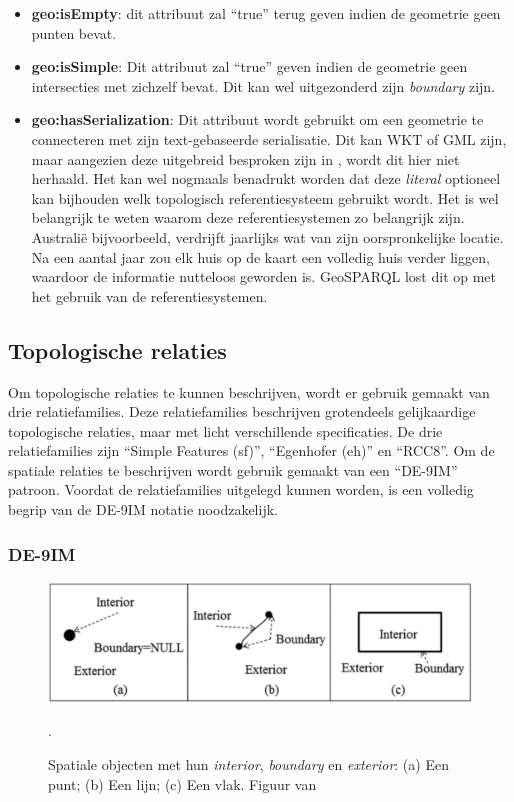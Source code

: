 \begin{itemize}
    \item \textbf{geo:isEmpty}: dit attribuut zal ``true'' terug geven indien de geometrie geen punten bevat.
    \item \textbf{geo:isSimple}: Dit attribuut zal ``true'' geven indien de geometrie geen intersecties met zichzelf bevat. Dit kan wel uitgezonderd zijn \textit{boundary} zijn.
    \item \textbf{geo:hasSerialization}: Dit attribuut wordt gebruikt om een geometrie te connecteren met zijn text-gebaseerde serialisatie. Dit kan WKT of GML zijn, maar aangezien deze uitgebreid besproken zijn in , wordt dit hier niet herhaald. Het kan wel nogmaals benadrukt worden dat deze \textit{literal} optioneel kan bijhouden welk topologisch referentiesysteem gebruikt wordt. Het is wel belangrijk te weten waarom deze referentiesystemen zo belangrijk zijn. Australië bijvoorbeeld, verdrijft jaarlijks wat van zijn oorspronkelijke locatie. Na een aantal jaar zou elk huis op de kaart een volledig huis verder liggen, waardoor de informatie nutteloos geworden is. GeoSPARQL lost dit op met het gebruik van de referentiesystemen.
\end{itemize}


\subsection{Topologische relaties}
\label{subsec:topologische_relaties}
Om topologische relaties te kunnen beschrijven, wordt er gebruik gemaakt van drie relatiefamilies. Deze relatiefamilies beschrijven grotendeels gelijkaardige topologische relaties, maar met licht verschillende specificaties. De drie relatiefamilies zijn ``Simple Features (sf)'', ``Egenhofer (eh)'' en ``RCC8''. Om de spatiale relaties te beschrijven wordt gebruik gemaakt van een ``DE-9IM'' patroon. Voordat de relatiefamilies uitgelegd kunnen worden, is een volledig begrip van de DE-9IM notatie noodzakelijk.

\subsubsection{DE-9IM}
\begin{figure}[ht]
    \centering
    \includegraphics[width=0.9\linewidth]{images/spatial_objects_DE-9IM.png}
    \caption{Spatiale objecten met hun \textit{interior}, \textit{boundary} en \textit{exterior}: (a) Een punt; (b) Een lijn; (c) Een vlak. Figuur van \cite{shen2018classification}}.
    \label{fig:de-9im}
\end{figure}


